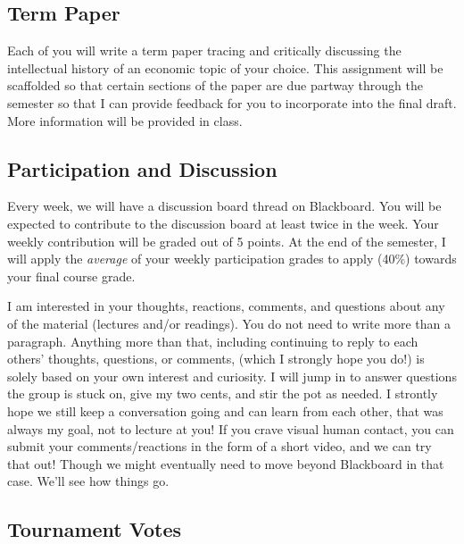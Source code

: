 \documentclass{article}
\begin{document}
\hypertarget{term-paper}{%
\subsection*{Term Paper}\label{term-paper}}

Each of you will write a term paper tracing and critically discussing
the intellectual history of an economic topic of your choice. This
assignment will be scaffolded so that certain sections of the paper are
due partway through the semester so that I can provide feedback for you
to incorporate into the final draft. More information will be provided
in class.

\hypertarget{participation-and-discussion}{%
\subsection*{Participation and
Discussion}\label{participation-and-discussion}}

Every week, we will have a discussion board thread on Blackboard. You
will be expected to contribute to the discussion board at least twice in
the week. Your weekly contribution will be graded out of 5 points. At
the end of the semester, I will apply the \emph{average} of your weekly
participation grades to apply (40\%) towards your final course grade.

I am interested in your thoughts, reactions, comments, and questions
about any of the material (lectures and/or readings). You do not need to
write more than a paragraph. Anything more than that, including
continuing to reply to each others' thoughts, questions, or comments,
(which I strongly hope you do!) is solely based on your own interest and
curiosity. I will jump in to answer questions the group is stuck on,
give my two cents, and stir the pot as needed. I strontly hope we still
keep a conversation going and can learn from each other, that was always
my goal, not to lecture at you! If you crave visual human contact, you
can submit your comments/reactions in the form of a short video, and we
can try that out! Though we might eventually need to move beyond
Blackboard in that case. We'll see how things go.

\hypertarget{tournament-votes}{%
\subsection{Tournament Votes}\label{tournament-votes}}
\end{document}
